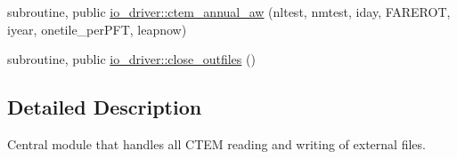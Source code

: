 {\bf }\par
\begin{DoxyCompactItemize}
\item 
subroutine, public \hyperlink{group__io__driver__ctem__annual__aw_gafd1b038009ed17a4f1046e11b88cf383}{io\+\_\+driver\+::ctem\+\_\+annual\+\_\+aw} (nltest, nmtest, iday, F\+A\+R\+E\+R\+O\+T, iyear, onetile\+\_\+per\+P\+F\+T, leapnow)
\end{DoxyCompactItemize}

{\bf }\par
\begin{DoxyCompactItemize}
\item 
subroutine, public \hyperlink{group__io__driver__close__outfiles_gacf096c34ff9fe20cee7785281362d9b6}{io\+\_\+driver\+::close\+\_\+outfiles} ()
\end{DoxyCompactItemize}



\subsection{Detailed Description}
Central module that handles all C\+T\+E\+M reading and writing of external files. 


